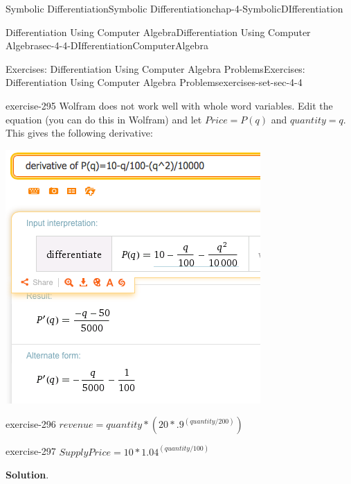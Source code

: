 \documentclass[oneside,10pt,]{book}
\numberwithin{equation}{section}
\begin{document}
\begin{chapterptx}{Symbolic Differentiation}{}{Symbolic Differentiation}{}{}{chap-4-SymbolicDIfferentiation}
\begin{sectionptx}{Differentiation Using Computer Algebra}{}{Differentiation Using Computer Algebra}{}{}{sec-4-4-DIfferentiationComputerAlgebra}
\begin{exercises-subsection-numberless}{Exercises: Differentiation Using Computer Algebra Problems}{}{Exercises: Differentiation Using Computer Algebra Problems}{}{}{exercises-set-sec-4-4}
\begin{divisionexercise}{7}{}{}{exercise-295}
\hypertarget{p-1753}{}%
Wolfram does not work well with whole word variables. Edit the equation (you can do this in Wolfram) and let \(Price = P(q)\) and \(quantity = q\). This gives the following derivative:%
\begin{sidebyside}{1}{0.25}{0.25}{0}%
\begin{sbspanel}{0.5}%
\includegraphics[width=1\linewidth]{images/sec4-4-sol7a.png}
\end{sbspanel}%
\end{sidebyside}%
\end{divisionexercise}%
\begin{divisionexercise}{8}{}{}{exercise-296}%
\hypertarget{p-1754}{}%
\(revenue=quantity* 
\left(20*.9^{(quantity/200)}\right)\)%
\end{divisionexercise}%
\begin{divisionexercise}{9}{}{}{exercise-297}%
\hypertarget{p-1755}{}%
\(SupplyPrice=10*1.04^{(quantity/100)}\)%
\par\smallskip%
\noindent\textbf{Solution}.\hypertarget{solution-148}{}\quad%
\leavevmode%
\begin{sidebyside}{1}{0.25}{0.25}{0}%
\begin{sbspanel}{0.5}%

\end{sbspanel}
\end{sidebyside}
\end{divisionexercise}
\end{exercises-subsection-numberless}
\end{sectionptx}
\end{chapterptx}
\end{document}
